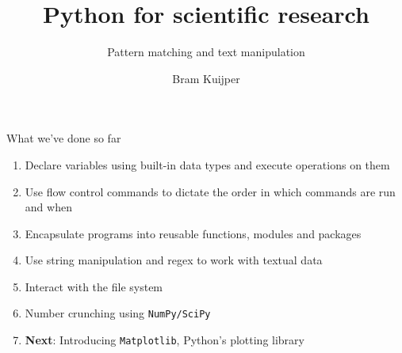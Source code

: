 \documentclass[xcolor=table]{beamer}
\title[Python for scientific research]{Python for scientific research}
\subtitle{Pattern matching and text manipulation}
\author{Bram Kuijper}
\institute[]{University of Exeter, Penryn Campus, UK}
\begin{document}
\begin{frame}
\titlepage
\end{frame}

\begin{frame}{What we've done so far}

	\begin{enumerate}
		\item Declare variables using built-in data types and execute operations
		on them
		\item Use flow control commands to dictate the order in which commands are run
		and when
		\item Encapsulate programs into reusable functions, modules and packages
		\item Use string manipulation and regex to work with textual data
        \item Interact with the file system
		\item Number crunching using \texttt{NumPy/SciPy}
		\item \textbf{Next}: Introducing \texttt{Matplotlib}, Python's plotting library
	\end{enumerate}

\end{frame}
\end{document}

